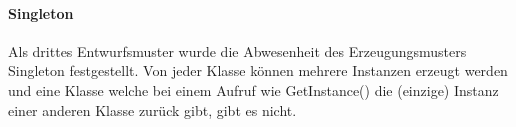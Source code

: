 \paragraph{Singleton}
Als drittes Entwurfsmuster wurde die Abwesenheit des Erzeugungsmusters Singleton festgestellt. Von jeder Klasse können mehrere Instanzen erzeugt werden und eine Klasse welche bei einem Aufruf wie \glqq GetInstance()\grqq{} die (einzige) Instanz einer anderen Klasse zurück gibt, gibt es nicht.

\endinput